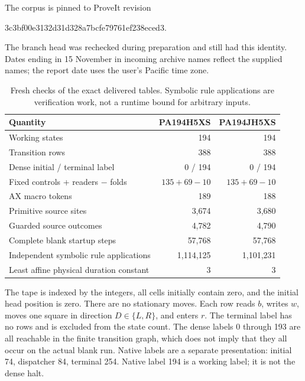 \documentclass[10pt,letterpaper]{article}
\newcommand{\file}[1]{\path{#1}}
\begin{document}
The corpus is pinned to ProveIt revision
\begin{center}\small\ttfamily
3c3bf00e3132d31d328a7bcfe79761ef238eced3.
\end{center}
The branch head was rechecked during preparation and still had this
identity.  Dates ending in 15 November in incoming archive names reflect
the supplied names; the report date uses the user's Pacific time zone.

\begin{table}[h]
\centering\small
\begin{tabular}{lrr}
\toprule
Quantity & PA194H5XS & PA194JH5XS\\
\midrule
Working states &194&194\\
Transition rows &388&388\\
Dense initial / terminal label &0 / 194&0 / 194\\
Fixed controls + readers $-$ folds & $135+69-10$ & $135+69-10$\\
AX macro tokens &189&188\\
Primitive source sites &3,674&3,680\\
Guarded source outcomes &4,782&4,790\\
Complete blank startup steps &57,768&57,768\\
Independent symbolic rule applications &1,114,125&1,101,231\\
Least affine physical duration constant &3&3\\
\bottomrule
\end{tabular}
\caption{Fresh checks of the exact delivered tables.  Symbolic rule applications are verification work, not a runtime bound for arbitrary inputs.}
\end{table}

The tape is indexed by the integers, all cells initially contain zero,
and the initial head position is zero.  There are no stationary moves.
Each row \file{q b w D r} reads \(b\), writes \(w\), moves one square
in direction \(D\in\{L,R\}\), and enters \(r\).  The terminal label
has no rows and is excluded from the state count.  The dense labels
0 through 193 are all reachable in the finite transition graph, which
does not imply that they all occur on the actual blank run.  Native
labels are a separate presentation: initial 74, dispatcher 84, terminal
254.  Native label 194 is a working label; it is not the dense halt.
\end{document}
